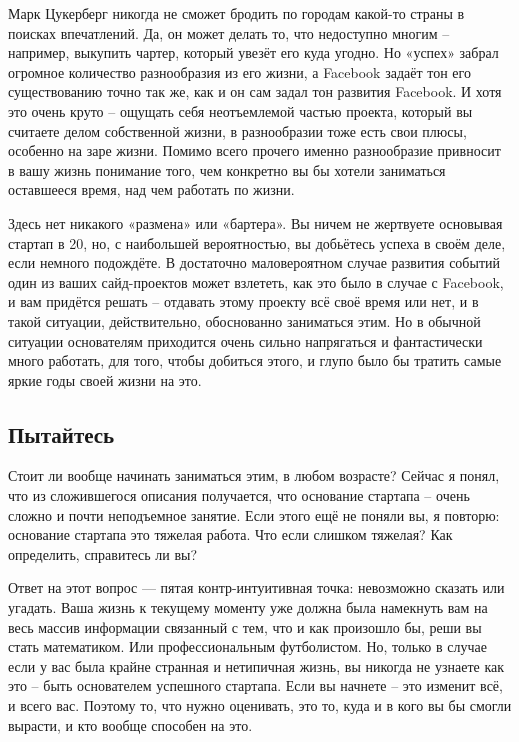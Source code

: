 \documentclass[ebook,12pt,oneside,openany]{memoir}
\begin{document}
Марк Цукерберг никогда не сможет бродить по городам какой-то страны в
поисках впечатлений. Да, он может делать то, что недоступно многим –
например, выкупить чартер, который увезёт его куда угодно. Но «успех»
забрал огромное количество разнообразия из его жизни, а Facebook
задаёт тон его существованию точно так же, как и он сам задал тон
развития Facebook. И хотя это очень круто – ощущать себя неотъемлемой
частью проекта, который вы считаете делом собственной жизни, в
разнообразии тоже есть свои плюсы, особенно на заре жизни. Помимо
всего прочего именно разнообразие привносит в вашу жизнь понимание
того, чем конкретно вы бы хотели заниматься оставшееся время, над чем
работать по жизни. \newline

Здесь нет никакого «размена» или «бартера». Вы ничем не жертвуете
основывая стартап в 20, но, с наибольшей вероятностью, вы добьётесь
успеха в своём деле, если немного подождёте. В достаточно
маловероятном случае развития событий один из ваших сайд-проектов
может взлететь, как это было в случае с Facebook, и вам придётся
решать – отдавать этому проекту всё своё время или нет, и в такой
ситуации, действительно, обоснованно заниматься этим. Но в обычной
ситуации основателям приходится очень сильно напрягаться и
фантастически много работать, для того, чтобы добиться этого, и глупо
было бы тратить самые яркие годы своей жизни на это. \newline

\subsection{Пытайтесь}

Стоит ли вообще начинать заниматься этим, в любом возрасте? Сейчас я
понял, что из сложившегося описания получается, что основание стартапа
– очень сложно и почти неподъемное занятие. Если этого ещё не поняли
вы, я повторю: основание стартапа это тяжелая работа. Что если слишком
тяжелая? Как определить, справитесь ли вы? \newline

Ответ на этот вопрос — пятая контр-интуитивная точка: невозможно
сказать или угадать. Ваша жизнь к текущему моменту уже должна была
намекнуть вам на весь массив информации связанный с тем, что и как
произошло бы, реши вы стать математиком. Или профессиональным
футболистом. Но, только в случае если у вас была крайне странная и
нетипичная жизнь, вы никогда не узнаете как это – быть основателем
успешного стартапа. Если вы начнете – это изменит всё, и всего вас.
Поэтому то, что нужно оценивать, это то, куда и в кого вы бы смогли
вырасти, и кто вообще способен на это. \newline
\end{document}
